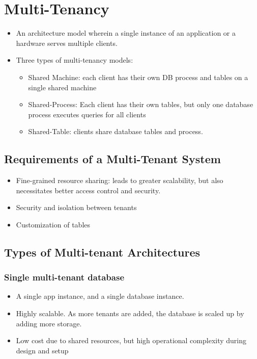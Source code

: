\documentclass{article}
\begin{document}
\section{Multi-Tenancy}
\begin{itemize}
    \item An architecture model wherein a single instance of an application or a hardware serves multiple clients. 
    
    \item Three types of multi-tenancy models:
    \begin{itemize}
        \item Shared Machine: each client has their own DB process and tables on a single shared machine
        
        \item Shared-Process: Each client has their own tables, but only one database process executes queries for all clients
        
        \item Shared-Table: clients share database tables and process. 
    \end{itemize}
\end{itemize}

\subsection{Requirements of a Multi-Tenant System}
\begin{itemize}
    \item Fine-grained resource sharing: leads to greater scalability, but also necessitates better access control and security.
    
    \item Security and isolation between tenants
    
    \item Customization of tables
\end{itemize}

\subsection{Types of Multi-tenant Architectures}
\subsubsection{Single multi-tenant database}
\begin{itemize}
    \item A single app instance, and a single database instance. 
    
    \item Highly scalable. As more tenants are added, the database is scaled up by adding more storage.
    
    \item Low cost due to shared resources, but high operational complexity during design and setup
\end{itemize}
\end{document}
